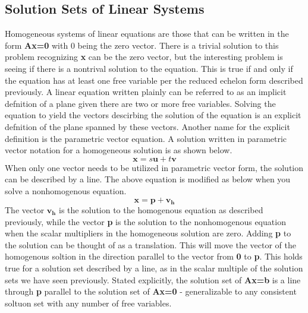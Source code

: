 \documentclass[12pt]{article}
\begin{document}
\subsection{Solution Sets of Linear Systems}
Homogeneous systems of linear equations are those that can be written in the form \textbf{Ax=0} with 0 being the zero vector. There is a trivial solution to this problem %
recognizing \textbf{x} can be the zero vector, but the interesting problem is seeing if there is a nontrival solution to the equation. This is true if and only if %
the equation has at least one free variable per the reduced echelon form described previously. 
\newline
\newline
A linear equation written plainly can be referred to as an implicit defnition of a plane given there are two or more free variables. Solving the equation to yield the vectors %
descirbing the solution of the equation is an explicit defnition of the plane spanned by these vectors. Another name for the explicit definition is the parametric vector%
 equation. A solution written in parametric vector notation for a homogeneous solution is as shown below.
\begin{equation}
     \mathbf{x} = s\mathbf{u}+t\mathbf{v}
\end{equation}
When only one vector needs to be utilized in parametric vector form, the solution can be described by a line. 
\newline
\newline
The above equation is modified as below when you solve a nonhomogenous equation.
\begin{equation}
    \mathbf{x} = \mathbf{p} + \mathbf{v_h}
\end{equation}
\newline
The vector $\mathbf{v_h}$ is the solution to the homogenous equation as described previously, while the vector \textbf{p} is the solution to the nonhomogenous equation when %
the scalar multipliers in the homogeneous solution are zero. Adding \textbf{p} to the solution can be thought of as a translation. This will move the vector of the homogenous %
soltion in the direction parallel to the vector from \textbf{0} to \textbf{p}. This holds true for a solution set described by a line, as in the scalar multiple of the %
solution sets we have seen previously. Stated explicitly, the solution set of \textbf{Ax=b} is a line through \textbf{p} parallel to the solution set of \textbf{Ax=0} - %
generalizable to any consistent soltuon set with any number of free variables.
\end{document}

